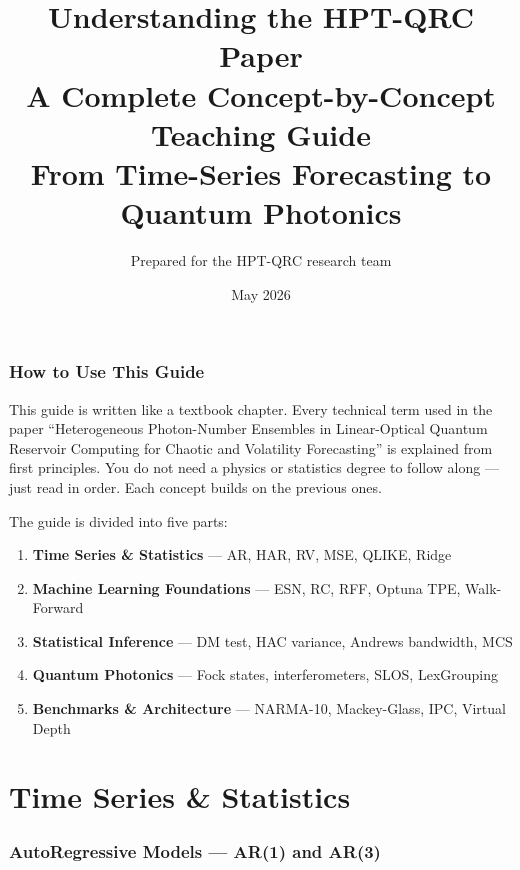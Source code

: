 \documentclass[11pt]{article}
\title{\textbf{Understanding the HPT-QRC Paper}\\[0.4em]
       \large A Complete Concept-by-Concept Teaching Guide\\[0.2em]
       \normalsize From Time-Series Forecasting to Quantum Photonics}
\author{Prepared for the HPT-QRC research team}
\date{May 2026}
\begin{document}
\maketitle
\tableofcontents
\clearpage

\section*{How to Use This Guide}
This guide is written like a textbook chapter. Every technical term used in the
paper ``Heterogeneous Photon-Number Ensembles in Linear-Optical Quantum Reservoir
Computing for Chaotic and Volatility Forecasting'' is explained from first
principles. You do not need a physics or statistics degree to follow along ---
just read in order. Each concept builds on the previous ones.

The guide is divided into five parts:
\begin{enumerate}
  \item \textbf{Time Series \& Statistics} --- AR, HAR, RV, MSE, QLIKE, Ridge
  \item \textbf{Machine Learning Foundations} --- ESN, RC, RFF, Optuna TPE, Walk-Forward
  \item \textbf{Statistical Inference} --- DM test, HAC variance, Andrews bandwidth, MCS
  \item \textbf{Quantum Photonics} --- Fock states, interferometers, SLOS, LexGrouping
  \item \textbf{Benchmarks \& Architecture} --- NARMA-10, Mackey-Glass, IPC, Virtual Depth
\end{enumerate}

\clearpage

\part{Time Series \& Statistics}

\section{AutoRegressive Models --- AR(1) and AR(3)}
\end{document}
